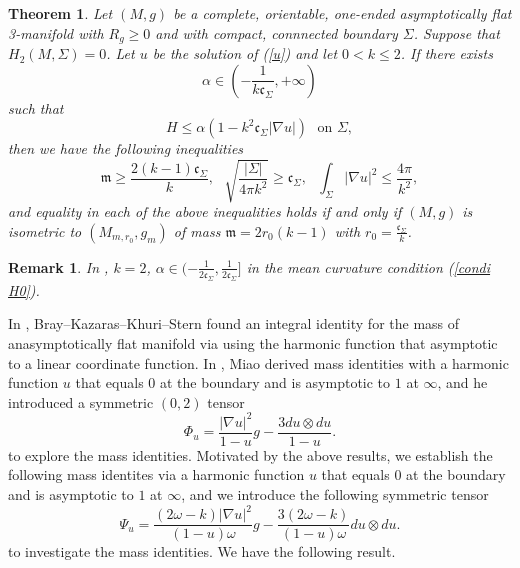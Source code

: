 \documentclass[12pt]{article}
\theoremstyle{definition}
\theoremstyle{plain}
\newtheorem{theorem}{Theorem}[section]
\newtheorem{remark}{Remark}[section]
\numberwithin{equation}{section}
\begin{document}
\begin{theorem}\label{th 1.3}
	Let $ (M,g) $ be a complete, orientable, one-ended asymptotically flat 3-manifold with $ R_{g}\geq 0 $ and with compact, connnected boundary $ \Sigma $. Suppose that $ H_{2}(M,\Sigma)=0 $. Let $ u $ be the solution of (\ref{u}) and let $ 0<k\leq 2 $. If there exists 
\begin{equation}
\alpha\in (-\frac{1}{k\mathfrak{c}_{\Sigma}},+\infty) 
\end{equation}
such that
\begin{equation}\label{condi H0}
H\leq \alpha(1-k^{2}\mathfrak{c}_{\Sigma}|\nabla u|)\,\,\,\,\text{on } \Sigma,
\end{equation}
	then we have the following inequalities
	$$
	\mathfrak{m}\geq \frac{2(k-1)\mathfrak{c}_{\Sigma}}{k},\,\,\,\,\sqrt{\frac{|\Sigma|}{4\pi k^{2}}}\geq \mathfrak{c}_{\Sigma},\,\,\,\,\int_{\Sigma}|\nabla u|^{2}\leq \frac{4\pi}{k^{2}},
	$$
and equality in each of the above inequalities holds if and only if $ (M,g) $ is isometric to $ (M_{m,r_{0}},g_{m}) $ of mass $ \mathfrak{m}=2r_{0}(k-1) $ with $ r_{0}=\frac{\mathfrak{c}_{\Sigma}}{k} $.
\end{theorem}
\begin{remark}
	In \cite{Oronzio}, $ k=2 $, $\alpha\in (-\frac{1}{2\mathfrak{c}_{\Sigma}},\frac{1}{2\mathfrak{c}_{\Sigma}}]$ in the mean curvature condition (\ref{condi H0}).
\end{remark}
In \cite{Bray2}, Bray–Kazaras–Khuri–Stern found an integral identity for the mass of anasymptotically flat manifold via using the harmonic function that asymptotic to a linear coordinate function. In \cite{Miao}, Miao derived mass identities with a harmonic
function $ u $ that equals $ 0 $ at the boundary and is asymptotic to $ 1 $ at $ \infty $, and he introduced a symmetric $ (0,2) $ tensor
$$
\Phi_{u}=\frac{|\nabla u|^{2}}{1-u}g-\frac{3du\otimes du}{1-u}.
$$
to explore the mass identities.
Motivated by the above results, we establish the following mass identites via a harmonic
function $ u $ that equals $ 0 $ at the boundary and is asymptotic to $ 1 $ at $ \infty $, and we introduce the following symmetric tensor
\begin{equation}\label{Psi}
\Psi_{u}=\frac{(2\omega-k)|\nabla u|^{2}}{(1-u)\omega}g-\frac{3(2\omega-k)}{(1-u)\omega}du\otimes du.
\end{equation}
to investigate the mass identities. We have the following result.
\end{document}
